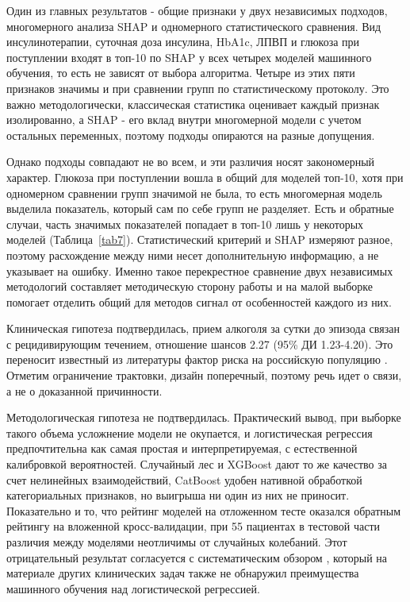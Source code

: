 \documentclass[pdflatex,sn-basic,Numbered]{sn-jnl}
\begin{document}
Один из главных результатов - общие признаки у двух независимых подходов, многомерного анализа SHAP и одномерного статистического сравнения. Вид инсулинотерапии, суточная доза инсулина, HbA1c, ЛПВП и глюкоза при поступлении входят в топ-10 по SHAP у всех четырех моделей машинного обучения, то есть не зависят от выбора алгоритма. Четыре из этих пяти признаков значимы и при сравнении групп по статистическому протоколу. Это важно методологически, классическая статистика оценивает каждый признак изолированно, а SHAP - его вклад внутри многомерной модели с учетом остальных переменных, поэтому подходы опираются на разные допущения.

Однако подходы совпадают не во всем, и эти различия носят закономерный характер. Глюкоза при поступлении вошла в общий для моделей топ-10, хотя при одномерном сравнении групп значимой не была, то есть многомерная модель выделила показатель, который сам по себе групп не разделяет. Есть и обратные случаи, часть значимых показателей попадает в топ-10 лишь у некоторых моделей (Таблица~\ref{tab7}). Статистический критерий и SHAP измеряют разное, поэтому расхождение между ними несет дополнительную информацию, а не указывает на ошибку. Именно такое перекрестное сравнение двух независимых методологий составляет методическую сторону работы и на малой выборке помогает отделить общий для методов сигнал от особенностей каждого из них.

Клиническая гипотеза подтвердилась, прием алкоголя за сутки до эпизода связан с рецидивирующим течением, отношение шансов 2.27 (95\% ДИ 1.23-4.20). Это переносит известный из литературы фактор риска на российскую популяцию \cite{ref7,ref9,ref16}. Отметим ограничение трактовки, дизайн поперечный, поэтому речь идет о связи, а не о доказанной причинности.

Методологическая гипотеза не подтвердилась. Практический вывод, при выборке такого объема усложнение модели не окупается, и логистическая регрессия предпочтительна как самая простая и интерпретируемая, с естественной калибровкой вероятностей. Случайный лес и XGBoost дают то же качество за счет нелинейных взаимодействий, CatBoost удобен нативной обработкой категориальных признаков, но выигрыша ни один из них не приносит. Показательно и то, что рейтинг моделей на отложенном тесте оказался обратным рейтингу на вложенной кросс-валидации, при 55 пациентах в тестовой части различия между моделями неотличимы от случайных колебаний. Этот отрицательный результат согласуется с систематическим обзором \cite{ref17}, который на материале других клинических задач также не обнаружил преимущества машинного обучения над логистической регрессией.
\end{document}
